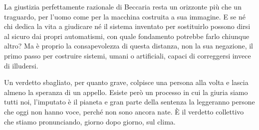 La giustizia perfettamente razionale di Beccaria resta un orizzonte pi\`{u} che un traguardo, per l'uomo come per la macchina costruita a sua immagine. E se n\'{e} chi dedica la vita a giudicare n\'{e} il sistema inventato per sostituirlo possono dirsi al sicuro dai propri automatismi, con quale fondamento potrebbe farlo chiunque altro? Ma \`{e} proprio la consapevolezza di questa distanza, non la sua negazione, il primo passo per costruire sistemi, umani o artificiali, capaci di correggersi invece di illudersi.

Un verdetto sbagliato, per quanto grave, colpisce una persona alla volta e lascia almeno la speranza di un appello. Esiste per\`{o} un processo in cui la giuria siamo tutti noi, l'imputato \`{e} il pianeta e gran parte della sentenza la leggeranno persone che oggi non hanno voce, perch\'{e} non sono ancora nate. \`{E} il verdetto collettivo che stiamo pronunciando, giorno dopo giorno, sul clima.
